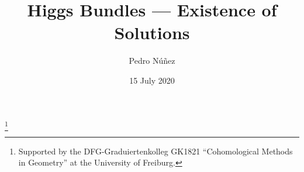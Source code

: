 
\author{Pedro Núñez}
\address{Pedro Núñez, Mathematisches Institut, Albert-Ludwigs-Universität Freiburg, Ernst-Zermelo-Straße 1, 79104 Freiburg im Breisgau, Germany}
\thanks{Supported by the DFG-Graduiertenkolleg GK1821 ``Cohomological Methods in Geometry'' at the University of Freiburg.}

\title[Higgs Bundles --- Existence of Solutions]{Higgs Bundles --- Existence of Solutions}
\date{15 July 2020}

\makeatletter
{}
\makeatother
